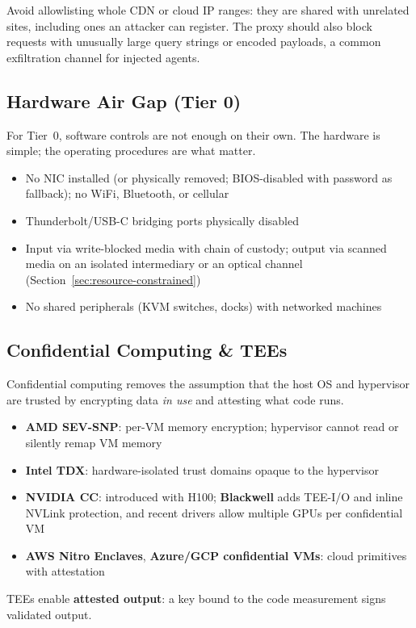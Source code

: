 \documentclass[11pt,letterpaper]{article}
\begin{document}
Avoid allowlisting whole CDN or cloud IP ranges: they are shared with unrelated sites, including ones an attacker can register. The proxy should also block requests with unusually large query strings or encoded payloads, a common exfiltration channel for injected agents.

\subsection{Hardware Air Gap (Tier 0)}

For Tier~0, software controls are not enough on their own. The hardware is simple; the operating procedures are what matter.

\begin{itemize}
  \item No NIC installed (or physically removed; BIOS-disabled with password as fallback); no WiFi, Bluetooth, or cellular
  \item Thunderbolt/USB-C bridging ports physically disabled
  \item Input via write-blocked media with chain of custody; output via scanned media on an isolated intermediary or an optical channel (Section~\ref{sec:resource-constrained})
  \item No shared peripherals (KVM switches, docks) with networked machines
\end{itemize}

\subsection{Confidential Computing \& TEEs}
\label{sec:tee}

\begin{hardwarebox}
Confidential computing removes the assumption that the host OS and hypervisor are trusted by encrypting data \emph{in use} and attesting what code runs.
\begin{itemize}
  \item \textbf{AMD SEV-SNP}: per-VM memory encryption; hypervisor cannot read or silently remap VM memory
  \item \textbf{Intel TDX}: hardware-isolated trust domains opaque to the hypervisor
  \item \textbf{NVIDIA CC}: introduced with H100; \textbf{Blackwell} adds TEE-I/O and inline NVLink protection, and recent drivers allow multiple GPUs per confidential VM~\cite{blackwell}
  \item \textbf{AWS Nitro Enclaves}, \textbf{Azure/GCP confidential VMs}: cloud primitives with attestation
\end{itemize}
TEEs enable \textbf{attested output}: a key bound to the code measurement signs validated output.
\end{hardwarebox}
\end{document}
